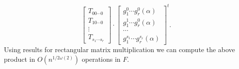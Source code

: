 $$
\left[ \begin{array}{c}
T_{00\cdots 0}\\
\hline
T_{10\cdots 0}\\
\hline
\vdots\\
\hline
T_{s_1 \cdots s_r}
\end{array} \right]
\cdot
\left[\begin{array}{c}
g_1^{0}\cdots g_r^{0}(\alpha) \\
\hline
g_1^{1}\cdots g_r^{0}(\alpha) \\
\hline
\cdots \\
\hline
g_1^{s_1}\cdots g_r^{s_r}(\alpha)  
\end{array}\right]^t.
$$
Using results for rectangular matrix multiplication we can compute the above product in $O(n^{1/2\omega(2)})$ operations in $F$.
%
%
%
%
%
